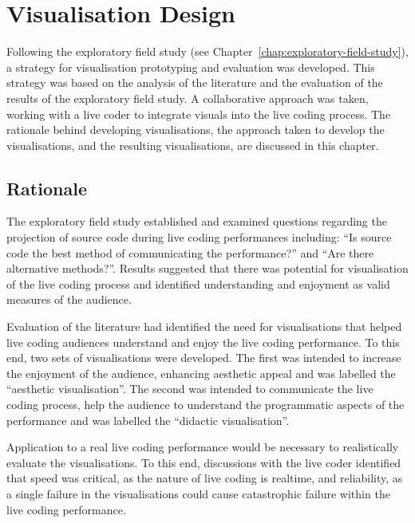 
\chapter{Visualisation Design}
\label{chap:visualisation-design}

Following the exploratory field study (see Chapter~\ref{chap:exploratory-field-study}), a strategy for visualisation prototyping and evaluation was developed. This strategy was based on the analysis of the literature and the evaluation of the results of the exploratory field study. A collaborative approach was taken, working with a live coder to integrate visuals into the live coding process. The rationale behind developing visualisations, the approach taken to develop the visualisations, and the resulting visualisations, are discussed in this chapter.

\section{Rationale}

The exploratory field study established and examined questions regarding the projection of source code during live coding performances including: ``Is source code the best method of communicating the performance?'' and ``Are there alternative methods?''. Results suggested that there was potential for visualisation of the live coding process and identified understanding and enjoyment as valid measures of the audience.

Evaluation of the literature had identified the need for visualisations that helped live coding audiences understand and enjoy the live coding performance. To this end, two sets of visualisations were developed. The first was intended to increase the enjoyment of the audience, enhancing aesthetic appeal and was labelled the ``aesthetic visualisation''. The second was intended to communicate the live coding process, help the audience to understand the programmatic aspects of the performance and was labelled the ``didactic visualisation''.

Application to a real live coding performance would be necessary to realistically evaluate the visualisations. To this end, discussions with the live coder identified that speed was critical, as the nature of live coding is realtime, and reliability, as a single failure in the visualisations could cause catastrophic failure within the live coding performance.

